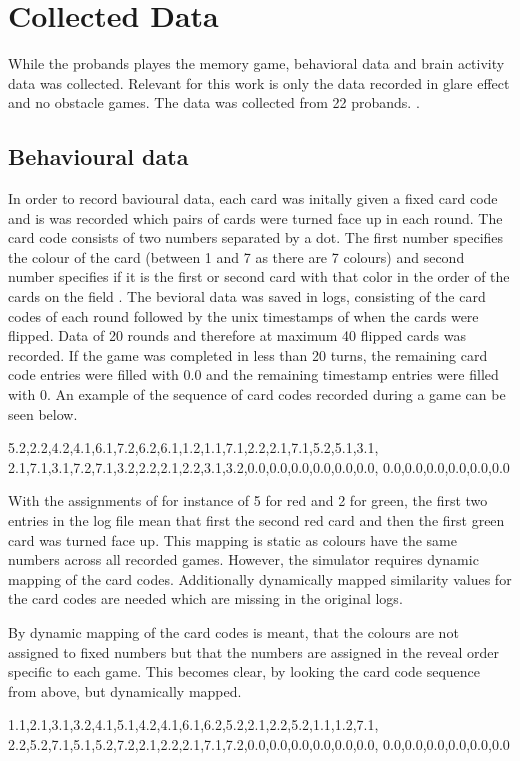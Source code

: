 \chapter{Collected Data}
While the probands playes the memory game, behavioral data and brain activity data was collected. Relevant for this work is only the data recorded in glare effect and no obstacle games. The data was collected from 22 probands. . 

\section{Behavioural data}
In order to record bavioural data, each card was initally given a fixed card code and is was recorded which pairs of cards were turned face up in each round. The card code consists of two numbers separated by a dot. The first number specifies the colour of the card (between 1 and 7 as there are 7 colours) and second number specifies if it is the first or second card with that color in the order of the cards on the field . The bevioral data was saved in logs, consisting of the card codes of each round followed by the unix timestamps of when the cards were flipped. Data of 20 rounds and therefore at maximum 40 flipped cards was recorded. If the game was completed in less than 20 turns, the remaining card code entries were filled with 0.0 and the remaining timestamp entries were filled with 0. An example of the sequence of card codes recorded during a game can be seen below.
\begin{verbatim*}
5.2,2.2,4.2,4.1,6.1,7.2,6.2,6.1,1.2,1.1,7.1,2.2,2.1,7.1,5.2,5.1,3.1,
2.1,7.1,3.1,7.2,7.1,3.2,2.2,2.1,2.2,3.1,3.2,0.0,0.0,0.0,0.0,0.0,0.0,
0.0,0.0,0.0,0.0,0.0,0.0
\end{verbatim*}

 With the assignments of for instance of 5 for red and 2 for green, the first two entries in the log file mean that first the second red card and then the first green card was turned face up. This mapping is static as colours have the same numbers across all recorded games. However, the simulator requires dynamic mapping of the card codes. Additionally dynamically mapped similarity values for the card codes are needed which are missing in the original logs.

By dynamic mapping of the card codes is meant, that the colours are not assigned to fixed numbers but that the numbers are assigned in the reveal order specific to each game. This becomes clear, by looking the card code sequence from above, but dynamically mapped.
\begin{verbatim*}
1.1,2.1,3.1,3.2,4.1,5.1,4.2,4.1,6.1,6.2,5.2,2.1,2.2,5.2,1.1,1.2,7.1,
2.2,5.2,7.1,5.1,5.2,7.2,2.1,2.2,2.1,7.1,7.2,0.0,0.0,0.0,0.0,0.0,0.0,
0.0,0.0,0.0,0.0,0.0,0.0
\end{verbatim*}

